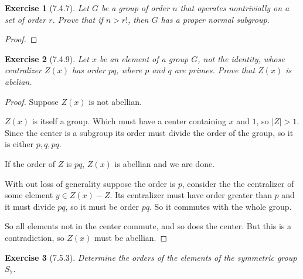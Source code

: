 \documentclass[12pt]{article}
\newtheorem*{exer}{Exercise}
\begin{document}

\begin{exer}[7.4.7]

    Let $G$ be a group of order $n$ that operates nontrivially on a set
    of order $r$. Prove that if $n > r!$, then $G$ has a proper normal
    subgroup.

\end{exer}

\begin{proof}

\end{proof}


\begin{exer}[7.4.9]

    Let $x$ be an element of a group $G$, not the identity, whose
    centralizer $Z(x)$ has order $pq$, where $p$ and $q$ are primes.
    Prove that $Z(x)$ is abelian.

\end{exer}

\begin{proof}

    Suppose $Z(x)$ is not abellian. 

    $Z(x)$ is itself a group. Which must have a center containing $x$
    and $1$, so $|Z| > 1$. Since the center is a subgroup its order must
    divide the order of the group, so it is either $p, q, pq$. 

    If the order of $Z$ is $pq$, $Z(x)$ is abellian and we are done.

    With out loss of generality suppose the order is $p$, consider the
    the centralizer of some element $y \in Z(x) - Z$. Its centralizer
    must have order greater than $p$ and it must divide $pq$, so it must
    be order $pq$. So it commutes with the whole group. 

    So all elements not in the center commute, and so does the center.
    But this is a contradiction, so $Z(x)$ must be abellian.

\end{proof}


\begin{exer}[7.5.3]

    Determine the orders of the elements of the symmetric group $S_7$.

\end{exer}
\end{document}
